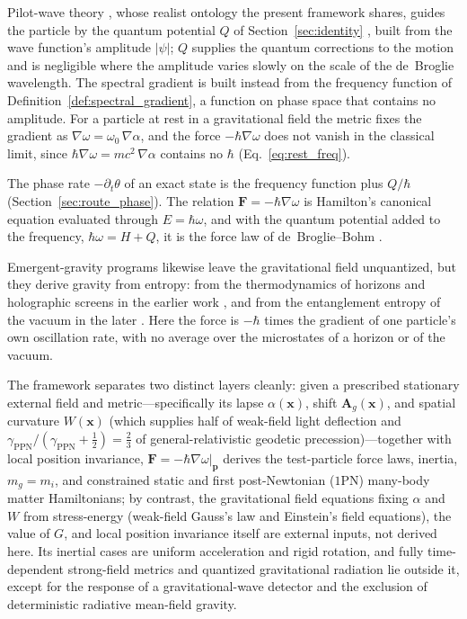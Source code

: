 \documentclass[aps,prd,onecolumn,tightenlines,nofootinbib,notitlepage,11pt,floatfix]{revtex4-2}
\theoremstyle{indentedtheorem}
\begin{document}
Pilot-wave theory \citep{deBroglie1927Wave,Bohm1952Suggested}, whose realist ontology the present framework shares, guides the particle by the quantum potential $Q$ of Section~\ref{sec:identity} \citep{Madelung1927Quantentheorie}, built from the wave function's amplitude $|\psi|$; $Q$ supplies the quantum corrections to the motion and is negligible where the amplitude varies slowly on the scale of the de~Broglie wavelength. The spectral gradient is built instead from the frequency function of Definition~\ref{def:spectral_gradient}, a function on phase space that contains no amplitude. For a particle at rest in a gravitational field the metric fixes the gradient as $\nabla\omega=\omega_0 \, \nabla\alpha$, and the force $-\hbar\nabla\omega$ does not vanish in the classical limit, since $\hbar\nabla\omega=mc^2 \, \nabla\alpha$ contains no $\hbar$ (Eq.~\eqref{eq:rest_freq}).

The phase rate $-\partial_t\theta$ of an exact state is the frequency function plus $Q/\hbar$ (Section~\ref{sec:route_phase}). The relation $\mathbf{F}=-\hbar\nabla\omega$ is Hamilton's canonical equation evaluated through $E=\hbar\omega$, and with the quantum potential added to the frequency, $\hbar\omega=H+Q$, it is the force law of de~Broglie--Bohm \citep{Bohm1952SuggestedB}.

Emergent-gravity programs likewise leave the gravitational field unquantized, but they derive gravity from entropy: from the thermodynamics of horizons and holographic screens in the earlier work \citep{Jacobson1995Thermodynamics,Padmanabhan2010Thermodynamics,Verlinde2011Origin}, and from the entanglement entropy of the vacuum in the later \citep{Jacobson2016Entanglement,Verlinde2017Emergent}. Here the force is $-\hbar$ times the gradient of one particle's own oscillation rate, with no average over the microstates of a horizon or of the vacuum.

The framework separates two distinct layers cleanly: given a prescribed stationary external field and metric---specifically its lapse $\alpha(\mathbf{x})$, shift $\mathbf{A}_g(\mathbf{x})$, and spatial curvature $W(\mathbf{x})$ (which supplies half of weak-field light deflection and $\gamma_\text{PPN}/(\gamma_\text{PPN}+\tfrac{1}{2})=\tfrac{2}{3}$ of general-relativistic geodetic precession)---together with local position invariance, $\mathbf{F}=-\hbar\nabla\omega|_{\mathbf{p}}$ derives the test-particle force laws, inertia, $m_g=m_i$, and constrained static and first post-Newtonian ($1$PN) many-body matter Hamiltonians; by contrast, the gravitational field equations fixing $\alpha$ and $W$ from stress-energy (weak-field Gauss's law and Einstein's field equations), the value of $G$, and local position invariance itself are external inputs, not derived here. Its inertial cases are uniform acceleration and rigid rotation, and fully time-dependent strong-field metrics and quantized gravitational radiation lie outside it, except for the response of a gravitational-wave detector and the exclusion of deterministic radiative mean-field gravity.
\end{document}
